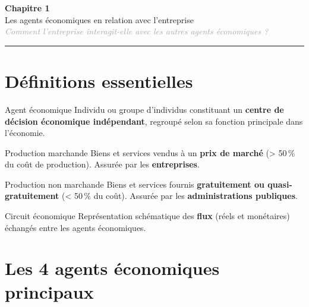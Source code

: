 \documentclass[11pt,a4paper]{article}
\begin{document}
\begin{center}
  {\Large\bfseries\textcolor{mainColor}{Chapitre 1}}\\[2pt]
  {\large Les agents économiques en relation avec l'entreprise}\\[4pt]
  \textit{\textcolor{darkGray}{Comment l'entreprise interagit-elle avec les autres agents économiques ?}}
\end{center}
\vspace{4pt}\hrule\vspace{8pt}

\section*{Définitions essentielles}

\begin{defbox}{Agent économique}
Individu ou groupe d'individus constituant un \textbf{centre de décision économique indépendant}, regroupé selon sa fonction principale dans l'économie.
\end{defbox}

\vspace{4pt}
\begin{defbox}{Production marchande}
Biens et services vendus à un \textbf{prix de marché} (> 50\,\% du coût de production). Assurée par les \textbf{entreprises}.
\end{defbox}

\vspace{4pt}
\begin{defbox}{Production non marchande}
Biens et services fournis \textbf{gratuitement ou quasi-gratuitement} (< 50\,\% du coût). Assurée par les \textbf{administrations publiques}.
\end{defbox}

\vspace{4pt}
\begin{defbox}{Circuit économique}
Représentation schématique des \textbf{flux} (réels et monétaires) échangés entre les agents économiques.
\end{defbox}

\section*{Les 4 agents économiques principaux}
\end{document}
